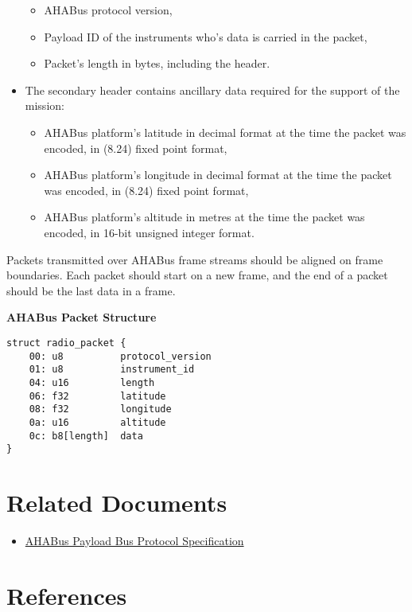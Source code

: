 \begin{appendices}
\begin{itemize}
  \begin{itemize}
  \item
    AHABus protocol version,
  \item
    Payload ID of the instruments who's data is carried in the packet,
  \item
    Packet's length in bytes, including the header.
  \end{itemize}
\item
  The secondary header contains ancillary data required for the support
  of the mission:

  \begin{itemize}
  \item
    AHABus platform's latitude in decimal format at the time the packet
    was encoded, in (8.24) fixed point format,
  \item
    AHABus platform's longitude in decimal format at the time the packet
    was encoded, in (8.24) fixed point format,
  \item
    AHABus platform's altitude in metres at the time the packet was
    encoded, in 16-bit unsigned integer format.
  \end{itemize}
\end{itemize}

Packets transmitted over AHABus frame streams should be aligned on frame
boundaries. Each packet should start on a new frame, and the end of a
packet should be the last data in a frame.

\textbf{AHABus Packet Structure}

\begin{verbatim}
struct radio_packet {
    00: u8          protocol_version
    01: u8          instrument_id
    04: u16         length
    06: f32         latitude
    08: f32         longitude
    0a: u16         altitude
    0c: b8[length]  data
}
\end{verbatim}

\section{Related Documents}\label{related-documents}

\begin{itemize}
\item
  \href{https://github.com/AHABus/src/software/payload-bus.md}{AHABus
  Payload Bus Protocol Specification}
\end{itemize}

\section{References}\label{references}


\end{appendices}
